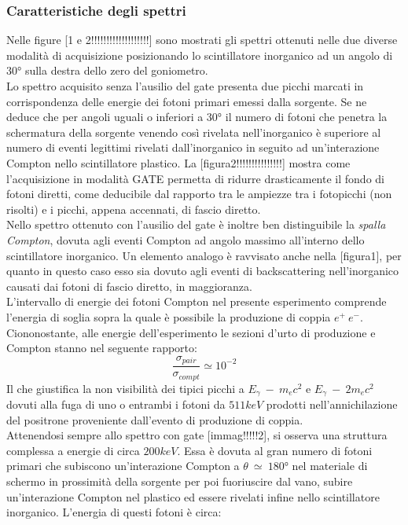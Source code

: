 \documentclass[11pt]{article}
\begin{document}
\subsubsection{Caratteristiche degli spettri}
Nelle figure [1 e 2!!!!!!!!!!!!!!!!!!!] sono mostrati gli spettri ottenuti nelle due diverse modalità di acquisizione posizionando lo scintillatore inorganico ad un angolo di 30° sulla destra dello zero del goniometro. \\
Lo spettro acquisito senza l'ausilio del gate presenta due picchi marcati in corrispondenza delle energie dei fotoni primari emessi dalla sorgente. Se ne deduce che per angoli uguali o inferiori a 30° il numero di fotoni che penetra la schermatura della sorgente venendo così rivelata nell'inorganico è superiore al numero di eventi legittimi rivelati dall'inorganico in seguito ad un'interazione Compton nello scintillatore plastico.
La [figura2!!!!!!!!!!!!!!!] mostra come l'acquisizione in modalità GATE permetta di ridurre drasticamente il fondo di fotoni diretti, come deducibile dal rapporto tra le ampiezze tra i fotopicchi (non risolti) e i picchi, appena accennati, di fascio diretto.\\
Nello spettro ottenuto con l'ausilio del gate è inoltre ben distinguibile la \textit{spalla Compton}, dovuta agli eventi Compton ad angolo massimo all'interno dello scintillatore inorganico. Un elemento analogo è ravvisato anche nella [figura1], per quanto in questo caso esso sia dovuto agli eventi di backscattering nell'inorganico causati dai fotoni di fascio diretto, in maggioranza.\\
L'intervallo di energie dei fotoni Compton nel presente esperimento comprende l'energia di soglia sopra la quale è possibile la produzione di coppia $e^+\ e^-$. Ciononostante, alle energie dell'esperimento le sezioni d'urto di produzione e Compton stanno nel seguente rapporto:
\begin{equation}
\frac{\sigma_{pair}}{\sigma_{compt}}\simeq 10^{-2}
\end{equation}
Il che giustifica la non visibilità dei tipici picchi a $E_\gamma \ - \ m_e c^2$ e $E_\gamma \ - \ 2m_e c^2$ dovuti alla fuga di uno o entrambi i fotoni da $511 keV$ prodotti nell'annichilazione del positrone proveniente dall'evento di produzione di coppia.\\
Attenendosi sempre allo spettro con gate [immag!!!!!2], si osserva una struttura complessa a energie di circa $200 keV$. Essa è dovuta al gran numero di fotoni primari che subiscono un'interazione Compton a $\theta \ \simeq \ 180°$ nel materiale di schermo in prossimità della sorgente per poi fuoriuscire dal vano, subire un'interazione Compton nel plastico ed essere rivelati infine nello scintillatore inorganico. L'energia di questi fotoni è circa:
\end{document}
